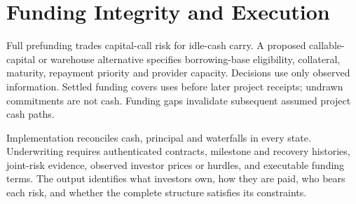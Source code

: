 \section{Funding Integrity and Execution}
Full prefunding trades capital-call risk for idle-cash carry. A proposed
callable-capital or warehouse alternative specifies borrowing-base eligibility,
collateral, maturity, repayment priority and provider capacity. Decisions use
only observed information. Settled funding covers uses before later project
receipts; undrawn commitments are not cash. Funding gaps invalidate subsequent
assumed project cash paths.

Implementation reconciles cash, principal and waterfalls in every state.
Underwriting requires authenticated contracts, milestone and recovery histories,
joint-risk evidence, observed investor prices or hurdles, and executable funding
terms. The output identifies what investors own, how they are paid, who bears
each risk, and whether the complete structure satisfies its constraints.




